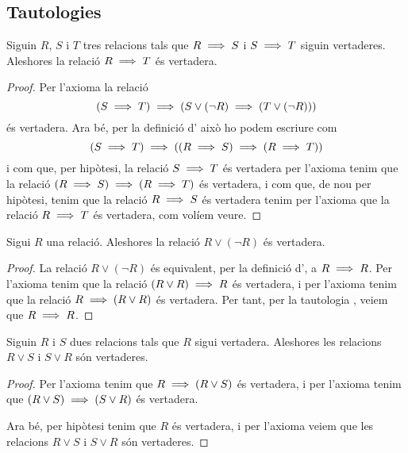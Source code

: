 \documentclass[../Apunts.tex]{subfiles}
\begin{document}
	\subsection{Tautologies}
	\begin{tautology}
		\label{taut:transitivitat implicacions}
		Siguin \(R\), \(S\) i \(T\) tres relacions tals que \(R\implies S\) i \(S\implies T\) siguin vertaderes. Aleshores la relació \(R\implies T\) és vertadera.
		\begin{proof}
			Per l'axioma  la relació
			\[(S\implies T)\implies(S\lor(\lnot R)\implies(T\lor(\lnot R)))\]
			és vertadera. Ara bé, per la definició d' això ho podem escriure com
			\[(S\implies T)\implies((R\implies S)\implies(R\implies T))\]
			i com que, per hipòtesi, la relació \(S\implies T\) és vertadera per l'axioma  tenim que la relació \((R\implies S)\implies(R\implies T)\) és vertadera, i com que, de nou per hipòtesi, tenim que la relació \(R\implies S\) és vertadera tenim per l'axioma  que la relació \(R\implies T\) és vertadera, com volíem veure.
		\end{proof}
	\end{tautology}
	\begin{tautology}
		\label{taut:R o no R és vertadera}\label{taut:tercer exclòs}
		Sigui \(R\) una relació. Aleshores la relació \(R\lor(\lnot R)\) és vertadera.
		\begin{proof}
			La relació \(R\lor(\lnot R)\) és equivalent, per la definició d', a \(R\implies R\). Per l'axioma  tenim que la relació \((R\lor R)\implies R\) és vertadera, i per l'axioma  tenim que la relació \(R\implies(R\lor R)\) és vertadera. Per tant, per la tautologia , veiem que \(R\implies R\).
		\end{proof}
	\end{tautology}
	\begin{tautology}
		\label{taut:disjunció és vertadera si una de les relaciones és vertadera}
		Siguin \(R\) i \(S\) dues relacions tals que \(R\) sigui vertadera. Aleshores les relacions \(R\lor S\) i \(S\lor R\) són vertaderes.
		\begin{proof}
			Per l'axioma  tenim que \(R\implies(R\lor S)\) és vertadera, i per l'axioma  tenim que \((R\lor S)\implies(S\lor R)\) és vertadera.
			
			Ara bé, per hipòtesi tenim que \(R\) és vertadera, i per l'axioma  veiem que les relacions \(R\lor S\) i \(S\lor R\) són vertaderes.
		\end{proof}
	\end{tautology}
\end{document}
